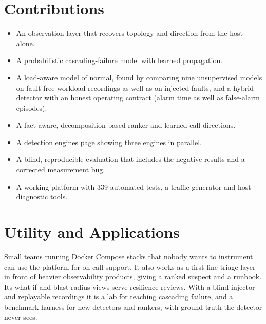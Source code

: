 \section{Contributions}
\begin{itemize}
\item An observation layer that recovers topology and direction from the host alone.
\item A probabilistic cascading-failure model with learned propagation.
\item A load-aware model of normal, found by comparing nine unsupervised models on fault-free workload recordings as well as on injected faults, and a hybrid detector with an honest operating contract (alarm time as well as false-alarm episodes).
\item A fact-aware, decomposition-based ranker and learned call directions.
\item A detection engines page showing three engines in parallel.
\item A blind, reproducible evaluation that includes the negative results and a corrected measurement bug.
\item A working platform with 339 automated tests, a traffic generator and host-diagnostic tools.
\end{itemize}

\section{Utility and Applications}
Small teams running Docker Compose stacks that nobody wants to instrument can use the platform for on-call support. It also works as a first-line triage layer in front of heavier observability products, giving a ranked suspect and a runbook. Its what-if and blast-radius views serve resilience reviews. With a blind injector and replayable recordings it is a lab for teaching cascading failure, and a benchmark harness for new detectors and rankers, with ground truth the detector never sees.

